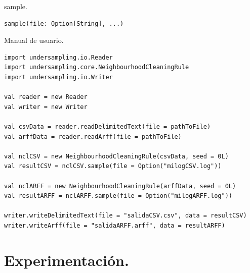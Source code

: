 \documentclass[10pt]{beamer}
\begin{document}
\begin{frame}[fragile]{sample.}
\begin{lstlisting}[frame=single, basicstyle=\scriptsize, breaklines=true]
sample(file: Option[String], ...)
\end{lstlisting}
\end{frame}

\begin{frame}[fragile]{Manual de usuario.}
\begin{lstlisting}[frame=single, basicstyle=\scriptsize, breaklines=true]
import undersampling.io.Reader
import undersampling.core.NeighbourhoodCleaningRule
import undersampling.io.Writer

val reader = new Reader
val writer = new Writer

val csvData = reader.readDelimitedText(file = pathToFile)
val arffData = reader.readArff(file = pathToFile)

val nclCSV = new NeighbourhoodCleaningRule(csvData, seed = 0L)
val resultCSV = nclCSV.sample(file = Option("milogCSV.log"))

val nclARFF = new NeighbourhoodCleaningRule(arffData, seed = 0L)
val resultARFF = nclARFF.sample(file = Option("milogARFF.log"))

writer.writeDelimitedText(file = "salidaCSV.csv", data = resultCSV)
writer.writeArff(file = "salidaARFF.arff", data = resultARFF)
\end{lstlisting}
\end{frame}

\section{Experimentación.}
\end{document}
